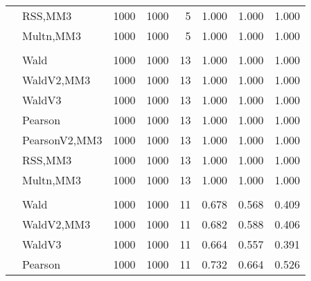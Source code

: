 \documentclass[
]{article}
\begin{document}
\begin{table}[H]
{\begin{tabular}[t]{llrrrrrr}
\hspace{1em} & RSS,MM3 & 1000 & 1000 & 5 & 1.000 & 1.000 & 1.000\\

\hspace{1em} & Multn,MM3 & 1000 & 1000 & 5 & 1.000 & 1.000 & 1.000\\
\cmidrule{1-8}
\addlinespace[0.3em]
\multicolumn{8}{l}{\textbf{1F 15V}}\\
\hspace{1em} & Wald & 1000 & 1000 & 13 & 1.000 & 1.000 & 1.000\\

\hspace{1em} & WaldV2,MM3 & 1000 & 1000 & 13 & 1.000 & 1.000 & 1.000\\

\hspace{1em} & WaldV3 & 1000 & 1000 & 13 & 1.000 & 1.000 & 1.000\\

\hspace{1em} & Pearson & 1000 & 1000 & 13 & 1.000 & 1.000 & 1.000\\

\hspace{1em} & PearsonV2,MM3 & 1000 & 1000 & 13 & 1.000 & 1.000 & 1.000\\

\hspace{1em} & RSS,MM3 & 1000 & 1000 & 13 & 1.000 & 1.000 & 1.000\\

\hspace{1em} & Multn,MM3 & 1000 & 1000 & 13 & 1.000 & 1.000 & 1.000\\
\cmidrule{1-8}
\addlinespace[0.3em]
\multicolumn{8}{l}{\textbf{2F 10V}}\\
\hspace{1em} & Wald & 1000 & 1000 & 11 & 0.678 & 0.568 & 0.409\\

\hspace{1em} & WaldV2,MM3 & 1000 & 1000 & 11 & 0.682 & 0.588 & 0.406\\

\hspace{1em} & WaldV3 & 1000 & 1000 & 11 & 0.664 & 0.557 & 0.391\\

\hspace{1em} & Pearson & 1000 & 1000 & 11 & 0.732 & 0.664 & 0.526\\


\end{tabular}}
\end{table}
\end{document}
